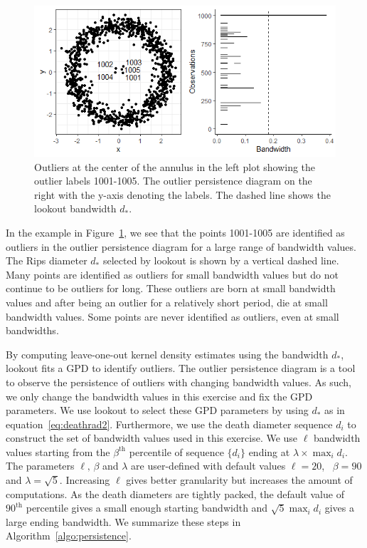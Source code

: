 \documentclass[letter,12pt]{article}
\begin{document}
\begin{figure}[!ht]
    \centering
    \includegraphics[scale=0.8]{Outlier_Persistence.png}
    \caption{Outliers at the center of the annulus in the left plot showing the outlier labels 1001-1005. The outlier persistence diagram on the right with the y-axis denoting the labels. The dashed line shows the lookout bandwidth $d_*$.}
    \label{fig:outlierpersistence}
\end{figure}

In the example in Figure~\ref{fig:outlierpersistence}, we see that the points  1001-1005  are identified as outliers in the outlier persistence diagram for a large range of bandwidth values. The Rips diameter $d_*$ selected by lookout  is shown by a vertical dashed line. 
Many points are identified as outliers for small bandwidth values but do not continue to be outliers for long. These outliers are born at small bandwidth values and after being an outlier for a relatively short period, die at small bandwidth values. Some points are never identified as outliers, even at small bandwidths.

By computing leave-one-out kernel density estimates using the bandwidth $d_*$, lookout fits a GPD to identify outliers. The outlier persistence diagram is a tool to observe the persistence of outliers with changing bandwidth values. As such, we only change the bandwidth values in this exercise and fix the GPD parameters. We use lookout to select these GPD parameters by using $d_*$ as in equation~\eqref{eq:deathrad2}. Furthermore, we use the death diameter sequence $d_i$ to construct the set of bandwidth values used in this exercise. We use $\ell$ bandwidth values starting from the $\beta^{\text{th}}$ percentile of sequence $\{d_i\}$ ending at $ \lambda \times \max_i{d_i}$. The parameters $\ell, \, \beta$ and $\lambda$ are user-defined with default values $\ell = 20$, \, $\beta= 90$ and $\lambda = \sqrt{5}$. Increasing $\ell$ gives better granularity but increases the amount of computations. As the death diameters are tightly packed, the default value of $90^{\text{th}}$ percentile gives a small enough starting bandwidth and $ \sqrt{5} \max_i{d_i}$ gives a large ending bandwidth. 
We summarize these steps in Algorithm~\ref{algo:persistence}.
\end{document}
